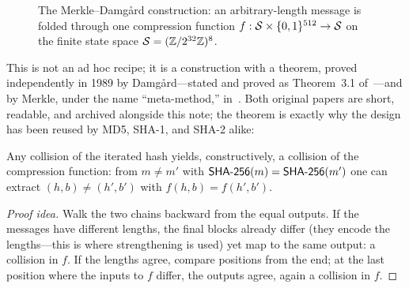 \begin{figure}[ht]
  \centering
  \caption{The Merkle--Damg{\aa}rd construction: an arbitrary-length
  message is folded through one compression function
  $f : \mathcal{S} \times \{0,1\}^{512} \to \mathcal{S}$ on the finite state
  space $\mathcal{S} = (\mathbb{Z}/2^{32}\mathbb{Z})^8$.}
  \label{fig:md}
\end{figure}

This is not an ad hoc recipe; it is a construction with a theorem, proved
independently in 1989 by Damg{\aa}rd---stated and proved as Theorem~3.1
of~\citet[pp.~419--420]{Damgard1989}---and by Merkle, under the name
``meta-method,'' in~\citet{MerkleOWHF1989}. Both original papers are
short, readable, and archived alongside this note; the theorem is exactly
why the design has been reused by MD5, SHA-1, and SHA-2 alike:

\begin{theorem}\label{thm:md}
Any collision of the iterated hash yields, constructively, a collision of
the compression function: from $m \ne m'$ with $\textsf{SHA-256}(m) = \textsf{SHA-256}(m')$ one
can extract $(h, b) \ne (h', b')$ with $f(h,b) = f(h',b')$.
\end{theorem}

\begin{proof}[Proof idea]
Walk the two chains backward from the equal outputs. If the messages have
different lengths, the final blocks already differ (they encode the
lengths---this is where strengthening is used) yet map to the same output:
a collision in $f$. If the lengths agree, compare positions from the end;
at the last position where the inputs to $f$ differ, the outputs agree,
again a collision in $f$.
\end{proof}

